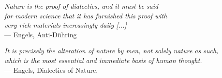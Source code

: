 \thispagestyle{empty}
{}

\vspace*{3cm}

\begin{flushright}{\slshape
	Nature is the proof of dialectics, and it must be said \\
	for modern science that it has furnished this proof with \\
	very rich materials increasingly daily [...]} \\ \medskip
    --- Engels, Anti-Dühring
\end{flushright}

\medskip

\begin{flushright}{\slshape
	It is precisely the alteration of nature by men, not solely nature as such, \\
	which is the most essential and immediate basis of human thought.} \\ \medskip
    --- Engels, Dialectics of Nature. 
\end{flushright}
